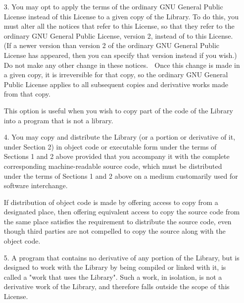 {\begin{itemize}
  Thus, it is not the intent of this section to claim rights or
  contest your rights to work written entirely by you; rather, the
  intent is to exercise the right to control the distribution of
  derivative or collective works based on the Library.
  
  In addition, mere aggregation of another work not based on the
  Library with the Library (or with a work based on the Library) on a
  volume of a storage or distribution medium does not bring the other
  work under the scope of this License.
  
\item [3.] You may opt to apply the terms of the ordinary GNU General
  Public License instead of this License to a given copy of the
  Library.  To do this, you must alter all the notices that refer to
  this License, so that they refer to the ordinary GNU General Public
  License, version 2, instead of to this License.  (If a newer version
  than version 2 of the ordinary GNU General Public License has
  appeared, then you can specify that version instead if you wish.)
  Do not make any other change in these notices.   Once this change
  is made in a given copy, it is irreversible for that copy, so the
  ordinary GNU General Public License applies to all subsequent copies
  and derivative works made from that copy.
  
  This option is useful when you wish to copy part of the code of the
  Library into a program that is not a library.
  
\item [4.] You may copy and distribute the Library (or a portion or
  derivative of it, under Section 2) in object code or executable form
  under the terms of Sections 1 and 2 above provided that you
  accompany it with the complete corresponding machine-readable source
  code, which must be distributed under the terms of Sections 1 and 2
  above on a medium customarily used for software interchange.
    
  If distribution of object code is made by offering access to copy
  from a designated place, then offering equivalent access to copy the
  source code from the same place satisfies the requirement to
  distribute the source code, even though third parties are not
  compelled to copy the source along with the object code.
  
\item [5.] A program that contains no derivative of any portion of the
  Library, but is designed to work with the Library by being compiled
  or linked with it, is called a "work that uses the Library".  Such a
  work, in isolation, is not a derivative work of the Library, and
  therefore falls outside the scope of this License.
  

\end{itemize}}
